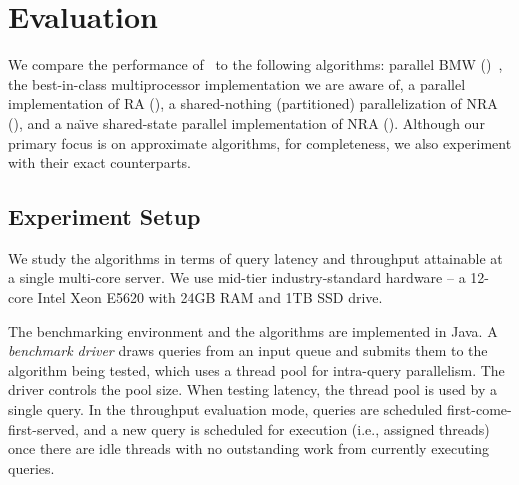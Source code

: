 \section{Evaluation} \label{sec:eval}

We compare the performance of \alg\ to the following algorithms: parallel BMW (\pBMW)~\cite{rojas2013efficient}, 
the best-in-class multiprocessor implementation we are aware of, a parallel implementation of RA (\pRA),  a shared-nothing (partitioned) parallelization of NRA (\sNRA), and a
na\"{\i}ve shared-state parallel implementation of NRA (\pNRA). 
Although our primary focus is on  approximate 
algorithms, for completeness, we also experiment with their exact counterparts.
%


\subsection{Experiment Setup}
\label{ssec:setup}

We study the algorithms in terms of query latency and throughput attainable at a single multi-core server. 
We use mid-tier industry-standard hardware -- a 12-core Intel Xeon E5620 with 24GB RAM and 1TB SSD drive. 


The benchmarking environment and the algorithms  are implemented in Java. 
A  \emph{benchmark driver} draws queries from an input queue and submits them to the algorithm being tested, which
uses a thread pool for intra-query parallelism. 
The driver controls the pool size. %
When testing latency, the thread pool is used by a single query. 
In the throughput evaluation mode, queries are scheduled first-come-first-served, 
and a new query is scheduled for execution (i.e., assigned threads) 
once  there are idle threads with no outstanding work from currently executing queries.

